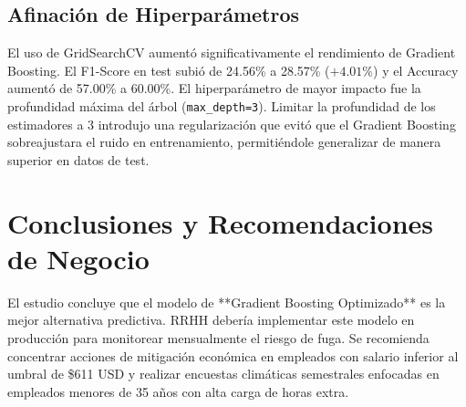 \documentclass[11pt,a4paper]{article}
\begin{document}
\subsection{Afinación de Hiperparámetros}
El uso de GridSearchCV aumentó significativamente el rendimiento de Gradient Boosting. El F1-Score en test subió de 24.56\% a 28.57\% ($+4.01\%$) y el Accuracy aumentó de 57.00\% a 60.00\%.
El hiperparámetro de mayor impacto fue la profundidad máxima del árbol (\texttt{max\_depth=3}). Limitar la profundidad de los estimadores a 3 introdujo una regularización que evitó que el Gradient Boosting sobreajustara el ruido en entrenamiento, permitiéndole generalizar de manera superior en datos de test.

\section{Conclusiones y Recomendaciones de Negocio}
El estudio concluye que el modelo de **Gradient Boosting Optimizado** es la mejor alternativa predictiva. RRHH debería implementar este modelo en producción para monitorear mensualmente el riesgo de fuga. Se recomienda concentrar acciones de mitigación económica en empleados con salario inferior al umbral de \$611 USD y realizar encuestas climáticas semestrales enfocadas en empleados menores de 35 años con alta carga de horas extra.
\end{document}
